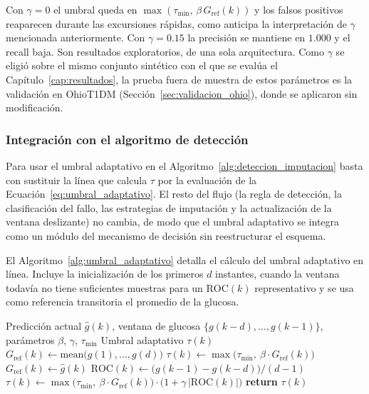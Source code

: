 \documentclass{report}
\begin{document}
Con $\gamma = 0$ el umbral queda en $\max(\tau_{\min},\, \beta\,G_{\mathrm{ref}}(k))$ y los falsos positivos reaparecen durante las excursiones rápidas, como anticipa la interpretación de $\gamma$ mencionada anteriormente. Con $\gamma = 0.15$ la precisión se mantiene en $1.000$ y el recall baja. Son resultados exploratorios, de una sola arquitectura. Como $\gamma$ se eligió sobre el mismo conjunto sintético con el que se evalúa el Capítulo~\ref{cap:resultados}, la prueba fuera de muestra de estos parámetros es la validación en OhioT1DM (Sección~\ref{sec:validacion_ohio}), donde se aplicaron sin modificación.

\subsubsection{Integración con el algoritmo de detección}
\label{subsec:integracion_algoritmo}

Para usar el umbral adaptativo en el Algoritmo~\ref{alg:deteccion_imputacion} basta con sustituir la línea que calcula $\tau$ por la evaluación de la Ecuación~\eqref{eq:umbral_adaptativo}. El resto del flujo (la regla de detección, la clasificación del fallo, las estrategias de imputación y la actualización de la ventana deslizante) no cambia, de modo que el umbral adaptativo se integra como un módulo del mecanismo de decisión sin reestructurar el esquema.

El Algoritmo~\ref{alg:umbral_adaptativo} detalla el cálculo del umbral adaptativo en línea. Incluye la inicialización de los primeros $d$ instantes, cuando la ventana todavía no tiene suficientes muestras para un $\mathrm{ROC}(k)$ representativo y se usa como referencia transitoria el promedio de la glucosa.

\begin{algorithm}[h]
\caption{Cómputo del umbral adaptativo B+ROC en línea.}
\label{alg:umbral_adaptativo}
\begin{algorithmic}[1]
\Require Predicción actual $\hat{g}(k)$, ventana de glucosa $\{g(k-d), \ldots, g(k-1)\}$, parámetros $\beta$, $\gamma$, $\tau_{\min}$
\Ensure Umbral adaptativo $\tau(k)$
    \State $G_{\mathrm{ref}}(k) \gets \mathrm{mean}\big(g(1), \ldots, g(d)\big)$ 
    \State $\tau(k) \gets \max\!\big(\tau_{\min},\ \beta \cdot G_{\mathrm{ref}}(k)\big)$ 
\Else
    \State $G_{\mathrm{ref}}(k) \gets \hat{g}(k)$ 
    \State $\mathrm{ROC}(k) \gets \big(g(k-1) - g(k-d)\big) / (d-1)$ 
    \State $\tau(k) \gets \max\!\big(\tau_{\min},\ \beta \cdot G_{\mathrm{ref}}(k)\big) \cdot \big(1 + \gamma\,|\mathrm{ROC}(k)|\big)$
\EndIf
\State \textbf{return} $\tau(k)$
\end{algorithmic}
\end{algorithm}
\end{document}
